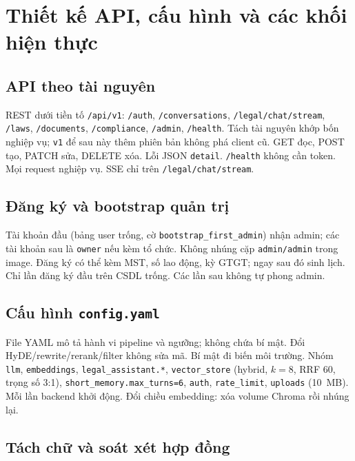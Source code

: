 \section{Thiết kế API, cấu hình và các khối hiện thực}

\subsection{API theo tài nguyên}

\boncau
{REST dưới tiền tố \texttt{/api/v1}: \texttt{/auth}, \texttt{/conversations},
\texttt{/legal/chat/stream}, \texttt{/laws}, \texttt{/documents},
\texttt{/compliance}, \texttt{/admin}, \texttt{/health}.}
{Tách tài nguyên khớp bốn nghiệp vụ; \texttt{v1} để sau này thêm phiên bản
không phá client cũ.}
{GET đọc, POST tạo, PATCH sửa, DELETE xóa. Lỗi JSON \texttt{detail}.
\texttt{/health} không cần token.}
{Mọi request nghiệp vụ. SSE chỉ trên \texttt{/legal/chat/stream}.}

\subsection{Đăng ký và bootstrap quản trị}

\boncau
{Tài khoản đầu (bảng user trống, cờ \texttt{bootstrap\_first\_admin}) nhận
admin; các tài khoản sau là \texttt{owner} nếu kèm tổ chức.}
{Không nhúng cặp \texttt{admin/admin} trong image.}
{Đăng ký có thể kèm MST, số lao động, kỳ GTGT; ngay sau đó sinh lịch.}
{Chỉ lần đăng ký đầu trên CSDL trống. Các lần sau không tự phong admin.}

\subsection{Cấu hình \texttt{config.yaml}}

\boncau
{File YAML mô tả hành vi pipeline và ngưỡng; không chứa bí mật.}
{Đổi HyDE/rewrite/rerank/filter không sửa mã. Bí mật đi biến môi trường.}
{Nhóm \texttt{llm}, \texttt{embeddings}, \texttt{legal\_assistant.*},
\texttt{vector\_store} (hybrid, $k=8$, RRF 60, trọng số 3:1),
\texttt{short\_memory.max\_turns=6}, \texttt{auth}, \texttt{rate\_limit},
\texttt{uploads} (10~MB).}
{Mỗi lần backend khởi động. Đổi chiều embedding: xóa volume Chroma rồi nhúng lại.}

\subsection{Tách chữ và soát xét hợp đồng}

